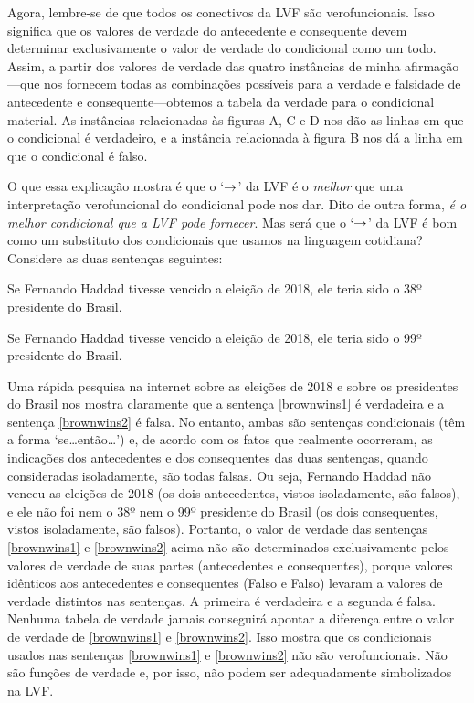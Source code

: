 Agora, lembre-se de que todos os conectivos da LVF são verofuncionais. Isso significa que os valores de verdade do antecedente e consequente devem determinar exclusivamente o valor de verdade do condicional como um todo.
Assim, a partir dos valores de verdade das quatro instâncias de minha afirmação---que nos fornecem todas as combinações possíveis para a verdade e falsidade de antecedente e consequente---obtemos a tabela da verdade para o condicional material.
As instâncias relacionadas às figuras A, C e D nos dão as linhas em que o condicional é verdadeiro, e a instância relacionada à figura B nos dá a linha em que o condicional é falso.

O que essa explicação mostra é que o `$\rightarrow$' da LVF é o \emph{melhor} que uma interpretação verofuncional do condicional pode nos dar.
Dito de outra forma, \emph{é o melhor condicional que a LVF pode fornecer}.
Mas será que o `$\rightarrow$' da LVF é bom como um substituto dos condicionais que usamos na linguagem cotidiana?
Considere as duas sentenças seguintes:
	\begin{earg}
		\item[\ex{brownwins1}] Se Fernando Haddad tivesse vencido a eleição de 2018, ele teria sido o 38º  presidente do Brasil.
		\item[\ex{brownwins2}] Se Fernando Haddad tivesse vencido a eleição de 2018, ele teria sido o 99º presidente do Brasil.
	\end{earg}
Uma rápida pesquisa na internet sobre as eleições de 2018 e sobre os presidentes do Brasil nos mostra claramente que a sentença \ref{brownwins1} é verdadeira e a sentença \ref{brownwins2} é falsa.
No entanto, ambas são sentenças condicionais (têm a forma `se\ldots então\ldots') e, de acordo com os fatos que realmente ocorreram, as indicações dos antecedentes e dos consequentes das duas sentenças, quando consideradas isoladamente, são todas falsas.
Ou seja, Fernando Haddad não venceu as eleições de 2018 (os dois antecedentes, vistos isoladamente, são falsos), e ele não foi nem o 38º nem o 99º presidente do Brasil (os dois consequentes, vistos isoladamente, são falsos).
Portanto, o valor de verdade das sentenças \ref{brownwins1} e \ref{brownwins2} acima não são determinados  exclusivamente pelos valores de verdade de suas partes (antecedentes e consequentes),
porque valores idênticos aos antecedentes e consequentes (Falso e Falso) levaram a valores de verdade distintos nas sentenças.
A primeira é verdadeira e a segunda é falsa.
Nenhuma tabela de verdade jamais conseguirá apontar a diferença entre o valor de verdade de \ref{brownwins1} e \ref{brownwins2}.
Isso mostra que os condicionais usados nas sentenças \ref{brownwins1} e \ref{brownwins2} não são verofuncionais.
Não são funções de verdade e, por isso, não podem ser adequadamente simbolizados na LVF.

